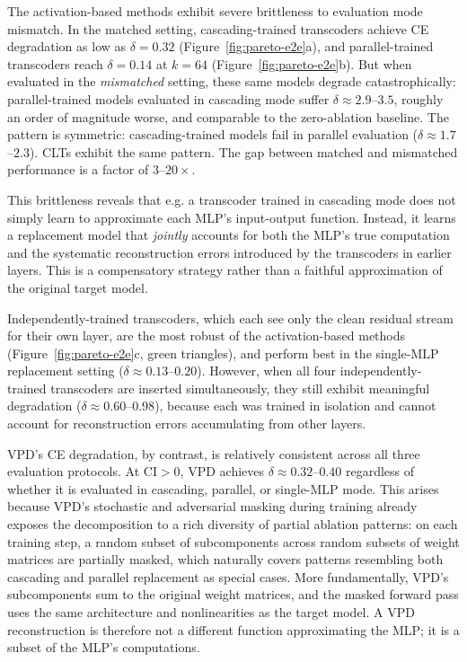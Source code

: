 \documentclass{article}
\begin{document}
The activation-based methods exhibit severe brittleness to evaluation mode mismatch. In the matched setting, cascading-trained transcoders achieve CE degradation as low as $\delta = 0.32$ (Figure~\ref{fig:pareto-e2e}a), and parallel-trained transcoders reach $\delta = 0.14$ at $k=64$ (Figure~\ref{fig:pareto-e2e}b). But when evaluated in the \emph{mismatched} setting, these same models degrade catastrophically: parallel-trained models evaluated in cascading mode suffer $\delta \approx 2.9$--$3.5$, roughly an order of magnitude worse, and comparable to the zero-ablation baseline. The pattern is symmetric: cascading-trained models fail in parallel evaluation ($\delta \approx 1.7$--$2.3$). CLTs exhibit the same pattern. The gap between matched and mismatched performance is a factor of $3$--$20\times$.

This brittleness reveals that e.g. a transcoder trained in cascading mode does not simply learn to approximate each MLP's input-output function. Instead, it learns a replacement model that \emph{jointly} accounts for both the MLP's true computation and the systematic reconstruction errors introduced by the transcoders in earlier layers. This is a compensatory strategy rather than a faithful approximation of the original target model.

Independently-trained transcoders, which each see only the clean residual stream for their own layer, are the most robust of the activation-based methods (Figure~\ref{fig:pareto-e2e}c, green triangles), and perform best in the single-MLP replacement setting ($\delta \approx 0.13$--$0.20$). However, when all four independently-trained transcoders are inserted simultaneously, they still exhibit meaningful degradation ($\delta \approx 0.60$--$0.98$), because each was trained in isolation and cannot account for reconstruction errors accumulating from other layers.

VPD's CE degradation, by contrast, is relatively consistent across all three evaluation protocols. At CI$>$0, VPD achieves $\delta \approx 0.32$--$0.40$ regardless of whether it is evaluated in cascading, parallel, or single-MLP mode. This arises because VPD's stochastic and adversarial masking during training already exposes the decomposition to a rich diversity of partial ablation patterns: on each training step, a random subset of subcomponents across random subsets of weight matrices are partially masked, which naturally covers patterns resembling both cascading and parallel replacement as special cases. More fundamentally, VPD's subcomponents sum to the original weight matrices, and the masked forward pass uses the same architecture and nonlinearities as the target model. A VPD reconstruction is therefore not a different function approximating the MLP; it is a subset of the MLP's computations.
\end{document}
